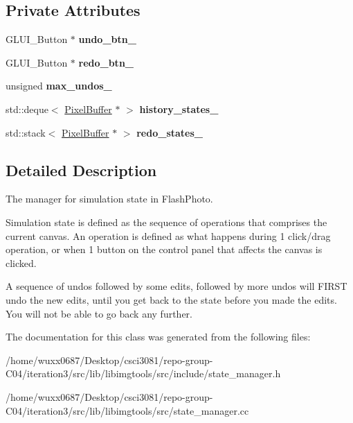 \subsection*{Private Attributes}
\begin{DoxyCompactItemize}
\item 
G\+L\+U\+I\+\_\+\+Button $\ast$ {\bfseries undo\+\_\+btn\+\_\+}\hypertarget{classimage__tools_1_1StateManager_adbe2820d914eb5ba08de3dfcc61aa82d}{}\label{classimage__tools_1_1StateManager_adbe2820d914eb5ba08de3dfcc61aa82d}

\item 
G\+L\+U\+I\+\_\+\+Button $\ast$ {\bfseries redo\+\_\+btn\+\_\+}\hypertarget{classimage__tools_1_1StateManager_a6fd0aef5e8fc7b52cf6f9de416ac4825}{}\label{classimage__tools_1_1StateManager_a6fd0aef5e8fc7b52cf6f9de416ac4825}

\item 
unsigned {\bfseries max\+\_\+undos\+\_\+}\hypertarget{classimage__tools_1_1StateManager_a01880162d6098bca3fa61e551365c214}{}\label{classimage__tools_1_1StateManager_a01880162d6098bca3fa61e551365c214}

\item 
std\+::deque$<$ \hyperlink{classimage__tools_1_1PixelBuffer}{Pixel\+Buffer} $\ast$ $>$ {\bfseries history\+\_\+states\+\_\+}\hypertarget{classimage__tools_1_1StateManager_afbf08670a705b087ae0e0235404151dd}{}\label{classimage__tools_1_1StateManager_afbf08670a705b087ae0e0235404151dd}

\item 
std\+::stack$<$ \hyperlink{classimage__tools_1_1PixelBuffer}{Pixel\+Buffer} $\ast$ $>$ {\bfseries redo\+\_\+states\+\_\+}\hypertarget{classimage__tools_1_1StateManager_a451e9938df3ecde4fad4e45892a8634a}{}\label{classimage__tools_1_1StateManager_a451e9938df3ecde4fad4e45892a8634a}

\end{DoxyCompactItemize}


\subsection{Detailed Description}
The manager for simulation state in Flash\+Photo. 

Simulation state is defined as the sequence of operations that comprises the current canvas. An operation is defined as what happens during 1 click/drag operation, or when 1 button on the control panel that affects the canvas is clicked.

A sequence of undos followed by some edits, followed by more undos will F\+I\+R\+ST undo the new edits, until you get back to the state before you made the edits. You will not be able to go back any further. 

The documentation for this class was generated from the following files\+:\begin{DoxyCompactItemize}
\item 
/home/wuxx0687/\+Desktop/csci3081/repo-\/group-\/\+C04/iteration3/src/lib/libimgtools/src/include/state\+\_\+manager.\+h\item 
/home/wuxx0687/\+Desktop/csci3081/repo-\/group-\/\+C04/iteration3/src/lib/libimgtools/src/state\+\_\+manager.\+cc\end{DoxyCompactItemize}
